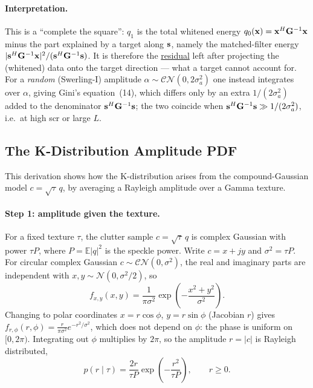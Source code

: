 \documentclass{article}
\begin{document}
\paragraph{Interpretation.}
This is a ``complete the square'': $q_1$ is the total whitened energy $q_0(\vb x)=\vb x^H\mathbf{G}^{-1}\vb x$ minus the part explained by a target along $\vb s$, namely the matched-filter energy $|\vb s^H\mathbf{G}^{-1}\vb x|^2/(\vb s^H\mathbf{G}^{-1}\vb s)$. It is therefore the \underline{residual} left after projecting the (whitened) data onto the target direction --- what a target cannot account for. For a \emph{random} (Swerling-I) amplitude $\alpha\sim\mathcal{CN}(0,2\sigma_a^2)$ one instead integrates over $\alpha$, giving Gini's equation~(14), which differs only by an extra $1/(2\sigma_a^2)$ added to the denominator $\vb s^H\mathbf{G}^{-1}\vb s$; the two coincide when $\vb s^H\mathbf{G}^{-1}\vb s\gg 1/(2\sigma_a^2)$, i.e.\ at high \gls{scr} or large $L$.

\subsection{The K-Distribution Amplitude PDF}
\label{app:kdist}

This derivation shows how the K-distribution arises from the compound-Gaussian
model $c=\sqrt{\tau}\,q$, by averaging a Rayleigh amplitude over a Gamma
texture.

\paragraph{Step 1: amplitude given the texture.}
For a fixed texture $\tau$, the clutter sample $c=\sqrt{\tau}\,q$ is complex
Gaussian with power $\tau P$, where $P=\mathbb E|q|^2$ is the speckle power.
Write $c=x+jy$ and $\sigma^2=\tau P$. For circular complex Gaussian
$c\sim\mathcal{CN}(0,\sigma^2)$, the real and imaginary parts are independent
with $x,y\sim\mathcal N(0,\sigma^2/2)$, so
\[
  f_{x,y}(x,y) = \frac{1}{\pi\sigma^2}\exp\!\left(-\frac{x^2+y^2}{\sigma^2}\right).
\]
Changing to polar coordinates $x=r\cos\phi$, $y=r\sin\phi$ (Jacobian $r$)
gives $f_{r,\phi}(r,\phi)=\frac{r}{\pi\sigma^2}e^{-r^2/\sigma^2}$, which does
not depend on $\phi$: the phase is uniform on $[0,2\pi)$. Integrating out
$\phi$ multiplies by $2\pi$, so the amplitude $r=|c|$ is Rayleigh distributed,
\begin{equation}
  p(r\mid\tau) = \frac{2r}{\tau P}\exp\!\left(-\frac{r^2}{\tau P}\right),
  \qquad r\ge 0 .
  \label{eq:kd:rayleigh}
\end{equation}
\end{document}

